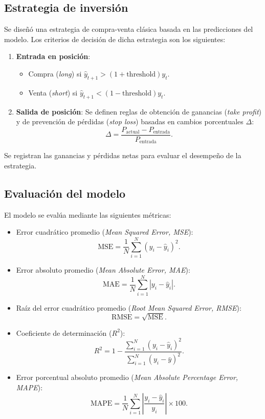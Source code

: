 \documentclass[]{article}
\begin{document}
\subsection{Estrategia de inversión}
Se diseñó una estrategia de compra-venta clásica basada en las predicciones del modelo. \cite{sec_trading101} Los criterios de decisión de dicha estrategia son los siguientes:
\begin{enumerate}
	\item \textbf{Entrada en posición}:
	\begin{itemize}
		\item Compra (\textit{long}) si \(\hat{y}_{t+1} > (1 + \text{threshold}) y_t\).
		\item Venta (\textit{short}) si \(\hat{y}_{t+1} < (1 - \text{threshold}) y_t\).
	\end{itemize}
	
	\item \textbf{Salida de posición}: Se definen reglas de obtención de ganancias (\textit{take profit}) y de prevención de pérdidas (\textit{stop loss}) basadas en cambios porcentuales \(\Delta\):
	\[
	\Delta = \frac{P_\text{actual} - P_\text{entrada}}{P_\text{entrada}}.
	\]
\end{enumerate}

Se registran las ganancias y pérdidas netas para evaluar el desempeño de la estrategia.

\subsection{Evaluación del modelo}
El modelo se evalúa mediante las siguientes métricas:
\begin{itemize}
	\item Error cuadrático promedio (\textit{Mean Squared Error, MSE}):
	\[
	\text{MSE} = \frac{1}{N} \sum_{i=1}^N (y_i - \hat{y}_i)^2.
	\]
	
	\item Error absoluto promedio (\textit{Mean Absolute Error, MAE}):
	\[
	\text{MAE} = \frac{1}{N} \sum_{i=1}^N |y_i - \hat{y}_i|.
	\]
	\item Raíz del error cuadrático promedio (\textit{Root Mean Squared Error, RMSE}):
	\[
	\text{RMSE} = \sqrt{\text{MSE}}.
	\]
	\item Coeficiente de determinación (\(R^2\)):
	\[
	R^2 = 1 - \frac{\sum_{i=1}^N (y_i - \hat{y}_i)^2}{\sum_{i=1}^N (y_i - \bar{y})^2}.
	\]
	\item Error porcentual absoluto promedio (\textit{Mean Absolute Percentage Error, MAPE}):
	\[
	\text{MAPE} = \frac{1}{N} \sum_{i=1}^N \left| \frac{y_i - \hat{y}_i}{y_i} \right| \times 100.
	\]
\end{itemize}
\end{document}
